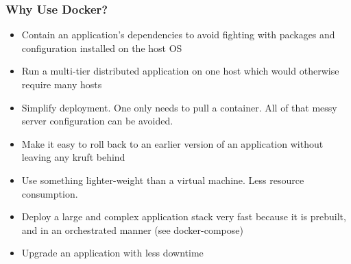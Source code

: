 \documentclass[helvetica,english,utf8,notitle,nologo]{beamer}
\begin{document}
\begin{frame}
  \frametitle{Why Use Docker?}

  \begin{itemize}
  \item Contain an application's dependencies to avoid fighting with
    packages and configuration installed on the host OS
  \item Run a multi-tier distributed application on one host which
    would otherwise require many hosts
  \item Simplify deployment. One only needs to pull a container. All
    of that messy server configuration can be avoided.
  \item Make it easy to roll back to an earlier version of an
    application without leaving any kruft behind
  \item Use something lighter-weight than a virtual machine. Less
    resource consumption.
  \item Deploy a large and complex application stack very fast because
    it is prebuilt, and in an orchestrated manner (see docker-compose)
  \item Upgrade an application with less downtime
  \end{itemize}
\end{frame}
\end{document}
